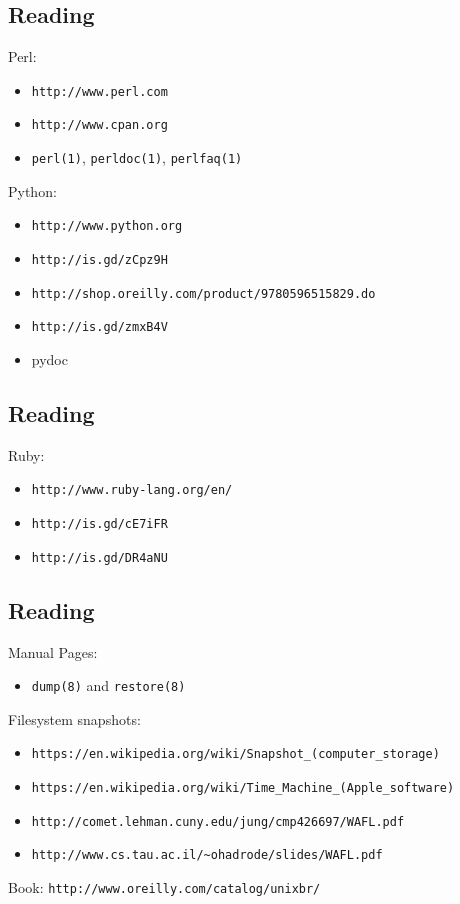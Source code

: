 \documentclass[xga]{xdvislides}
\begin{document}
\subsection{Reading}
Perl:
\begin{itemize}
	\item \verb+http://www.perl.com+
	\item \verb+http://www.cpan.org+
	\item \verb+perl(1)+, \verb+perldoc(1)+, \verb+perlfaq(1)+
\end{itemize}
Python:
\begin{itemize}
	\item \verb+http://www.python.org+
	\item \verb+http://is.gd/zCpz9H+
	\item \verb+http://shop.oreilly.com/product/9780596515829.do+
	\item \verb+http://is.gd/zmxB4V+
	\item pydoc
\end{itemize}

\subsection{Reading}
Ruby:
\begin{itemize}
	\item \verb+http://www.ruby-lang.org/en/+
	\item \verb+http://is.gd/cE7iFR+
	\item \verb+http://is.gd/DR4aNU+
\end{itemize}


\subsection{Reading}
Manual Pages:
\begin{itemize}
	\item \verb+dump(8)+ and \verb+restore(8)+
\end{itemize}
Filesystem snapshots:
\begin{itemize}
	\item \verb+https://en.wikipedia.org/wiki/Snapshot_(computer_storage)+
	\item \verb+https://en.wikipedia.org/wiki/Time_Machine_(Apple_software)+
	\item \verb+http://comet.lehman.cuny.edu/jung/cmp426697/WAFL.pdf+
	\item \verb+http://www.cs.tau.ac.il/~ohadrode/slides/WAFL.pdf+
\end{itemize}
\vspace{.5in}
Book: \verb+http://www.oreilly.com/catalog/unixbr/+
\end{document}
